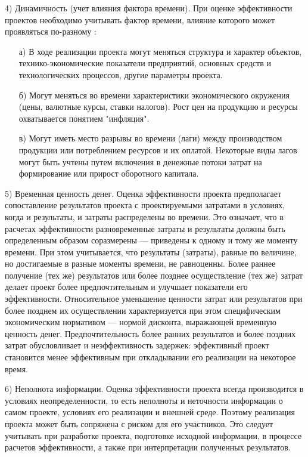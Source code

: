 4) Динамичность (учет влияния фактора времени).
При оценке эффективности проектов необходимо учитывать фактор времени, влияние которого может проявляться по-разному \cite[278]{golovan}:
\begin{enumerate}
	\item [а)] В ходе реализации проекта могут меняться структура и характер объектов, технико-экономические показатели предприятий, основных средств и технологических процессов, другие параметры проекта.
	\item [б)] Могут меняться во времени характеристики экономического окружения (цены, валютные курсы, ставки налогов). Рост цен на продукцию и ресурсы охватывается понятием "инфляция".
	\item [в)] Могут иметь место разрывы во времени (лаги) между производством продукции или потреблением ресурсов и их оплатой. Некоторые виды лагов могут быть учтены путем включения в денежные потоки затрат на формирование или прирост оборотного капитала.
\end{enumerate}

5) Временная ценность денег.
Оценка эффективности проекта предполагает сопоставление результатов проекта с проектируемыми затратами в условиях, когда и результаты, и затраты распределены во времени.
Это означает, что в расчетах эффективности разновременные затраты и результаты должны быть определенным образом соразмерены --- приведены к одному и тому же моменту времени.
При этом учитывается, что результаты (затраты), равные по величине, но достигаемые в разные моменты времени, не равноценны.
Более раннее получение (тех же) результатов или более позднее осуществление (тех же) затрат делает проект более предпочтительным и улучшает показатели его эффективности.
Относительное уменьшение ценности затрат или результатов при более позднем их осуществлении характеризуется при этом специфическим экономическим нормативом --- нормой дисконта, выражающей временную ценность денег.
Предпочтительность более ранних результатов и более поздних затрат обусловливает и неэффективность задержек: эффективный проект становится менее эффективным при откладывании его реализации на некоторое время.

6) Неполнота информации.
Оценка эффективности проекта всегда производится в условиях неопределенности, то есть неполноты и неточности информации о самом проекте, условиях его реализации и внешней среде.
Поэтому реализация проекта может быть сопряжена с риском для его участников.
Это следует учитывать при разработке проекта, подготовке исходной информации, в процессе расчетов эффективности, а также при интерпретации полученных результатов. 

